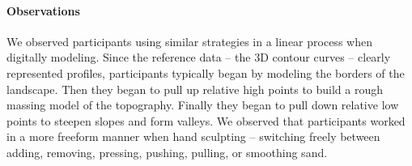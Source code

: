 \documentclass[prodmode,acmtochi]{acmsmall} %
\begin{document}
\paragraph{Observations}

% 
%


We observed participants using similar strategies in a linear process 
when digitally modeling. 
Since the reference data -- the 3D contour curves -- 
clearly represented profiles, 
participants typically began by modeling the borders %
of the landscape.
Then they began to pull up relative high points 
to build a rough massing model of the topography.
Finally they began to pull down relative low points to 
steepen slopes and form valleys.
We observed that participants 
worked in a more freeform manner 
when hand sculpting -- switching freely between
adding, removing, pressing, pushing, pulling, or smoothing
sand.


\end{document}
